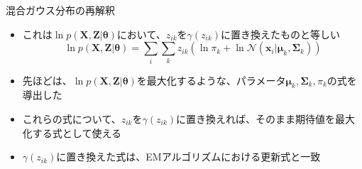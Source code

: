 \documentclass[dvipdfmx,notheorems,t]{beamer}
\begin{document}
\begin{frame}{混合ガウス分布の再解釈}
\begin{itemize}
\begin{itemize}
		\item これは$\ln p(\bm{X}, \bm{Z} | \bm{\theta})$において、$z_{ik}$を$\gamma(z_{ik})$に置き換えたものと等しい
		\begin{equation}
			\ln p(\bm{X}, \bm{Z} | \bm{\theta}) = \sum_i \sum_k z_{ik} \left( \ln \pi_k + \ln \mathcal{N}(\bm{x}_i | \bm{\mu}_k, \bm{\Sigma}_k) \right)
		\end{equation}
		
		\item 先ほどは、$\ln p(\bm{X}, \bm{Z} | \bm{\theta})$を最大化するような、パラメータ$\bm{\mu}_k, \bm{\Sigma}_k, \pi_k$の式を導出した
		\item これらの式について、$z_{ik}$を$\gamma(z_{ik})$に置き換えれば、そのまま期待値を最大化する式として使える
		\newline
		\item $\gamma(z_{ik})$に置き換えた式は、\alert{EMアルゴリズムにおける更新式と一致}
	\end{itemize}
\end{itemize}

\end{frame}
\end{document}
